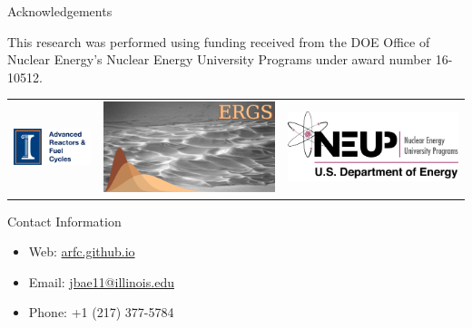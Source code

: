 \documentclass[final]{beamer}
\newlength{\onecolwid}
\newlength{\threecolwid}
\begin{document}
\begin{frame}[t]
\begin{columns}[t,totalwidth=\threecolwid]
\begin{column}{\onecolwid}
\begin{block}{Acknowledgements}

This research was performed using funding received
from the DOE Office of Nuclear Energy's Nuclear Energy
University Programs under award number 16-10512.

\vspace{10mm}
\begin{center}
\begin{tabular}{ccc}
\includegraphics[width=0.3\linewidth]{logo.png} & \includegraphics[width=0.3\linewidth]{ergs_logo.png} & \includegraphics[width=0.3\linewidth]{neup.png}
\end{tabular}
\end{center}


\end{block}





\begin{alertblock}{Contact Information}
\begin{itemize}
	
	\item Web: \href{arfc.github.io}{arfc.github.io}
	\item Email: \href{mailto:jbae11@illinois.edu}{jbae11@illinois.edu}
	\item Phone: +1 (217) 377-5784
\end{itemize}


\end{alertblock}
\end{column}
\end{columns}
\end{frame}
\end{document}

